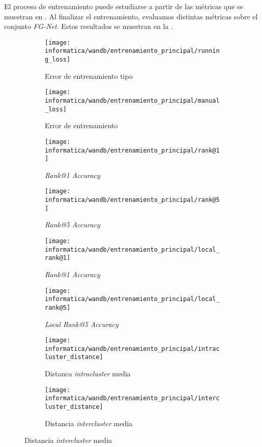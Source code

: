 El proceso de entrenamiento puede estudiarse a partir de las métricas que se muestran en . Al finalizar el entrenamiento, evaluamos distintas métricas sobre el conjunto \textit{FG-Net}. Estos resultados se muestran en la .


\begin{figure}[!hbtp]

    \ajustarsubcaptions
    \centering
    \begin{subfigure}[t]{0.45\textwidth}
        \texttt{[image: informatica/wandb/entrenamiento\_principal/running\_loss]}
        \caption{Error de entrenamiento tipo }
    \end{subfigure}
    \begin{subfigure}[t]{0.45\textwidth}
        \texttt{[image: informatica/wandb/entrenamiento\_principal/manual\_loss]}
        \caption{Error de entrenamiento}
    \end{subfigure}

    \begin{subfigure}[t]{0.45\textwidth}
        \texttt{[image: informatica/wandb/entrenamiento\_principal/rank@1]}
        \caption{\textit{Rank@1 Accuracy}}
    \end{subfigure}
    \begin{subfigure}[t]{0.45\textwidth}
        \texttt{[image: informatica/wandb/entrenamiento\_principal/rank@5]}
        \caption{\textit{Rank@5 Accuracy}}
    \end{subfigure}

    \begin{subfigure}[t]{0.45\textwidth}
        \texttt{[image: informatica/wandb/entrenamiento\_principal/local\_rank@1]}
        \caption{\textit{Rank@1 Accuracy}}
    \end{subfigure}
    \begin{subfigure}[t]{0.45\textwidth}
        \texttt{[image: informatica/wandb/entrenamiento\_principal/local\_rank@5]}
        \caption{\textit{Local Rank@5 Accuracy}}
    \end{subfigure}

    \begin{subfigure}[t]{0.45\textwidth}
        \texttt{[image: informatica/wandb/entrenamiento\_principal/intracluster\_distance]}
        \caption{Distanca \textit{intracluster} media}
    \end{subfigure}
    \begin{subfigure}[t]{0.45\textwidth}
        \texttt{[image: informatica/wandb/entrenamiento\_principal/intercluster\_distance]}
        \caption{Distancia \textit{intercluster} media}
    \end{subfigure}


\end{figure}
